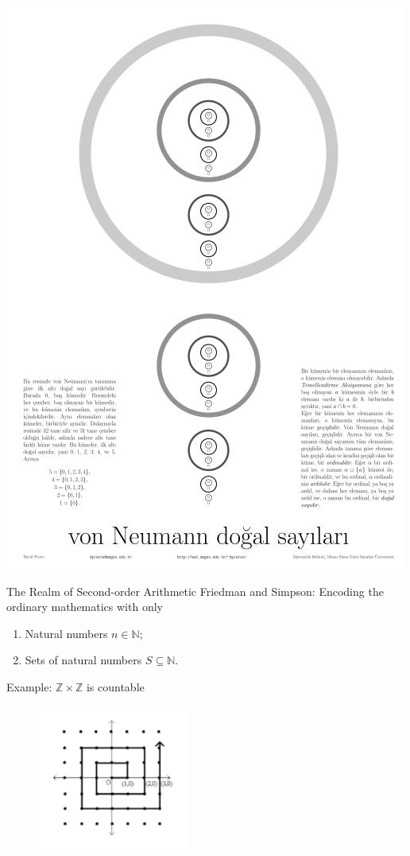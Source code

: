 \documentclass{beamer} %
\begin{document}
\begin{frame}
    \includegraphics[width=\textwidth]{ordinaller-poster-small.jpg}
\end{frame}

\begin{frame}{The Realm of Second-order Arithmetic}
    Friedman and Simpson: Encoding the ordinary mathematics with only 
    \begin{enumerate}
        \item Natural numbers $n \in \mathbb{N}$;
        \item Sets of natural numbers $S \subseteq \mathbb{N}$.
    \end{enumerate}
    \pause
    Example: $\mathbb{Z} \times \mathbb{Z}$ is countable
    \begin{figure}
        \includegraphics[width=5cm]{IMG_0607.jpg}
    \end{figure}
    
\end{frame}
\end{document}
